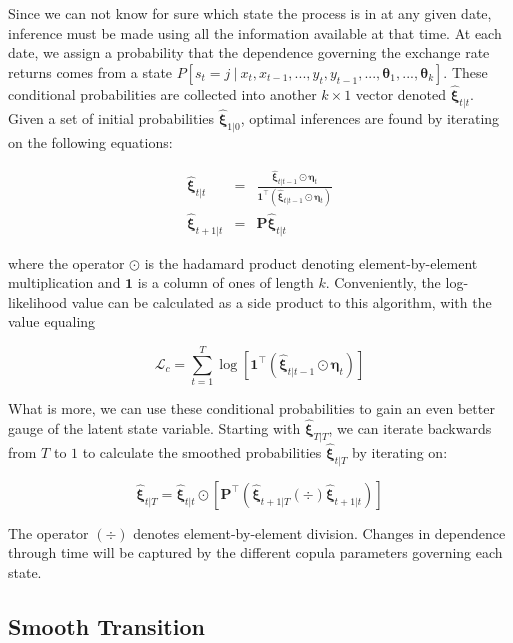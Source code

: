 \documentclass[12pt]{article}
\newcommand{\Lagr}{\mathcal{L}}
\newcommand{\boldXi}{\hat{\boldsymbol{\xi}}}
\begin{document}
Since we can not know for sure which state the process is in at any given date, inference must be made using all the information available at that time. At each date, we assign a probability that the dependence governing the exchange rate returns comes from a state $P\left[s_{t}=j~|~x_{t},x_{t-1},...,y_{t},y_{t-1},...,\mathbf{\theta}_{1},...,\mathbf{\theta}_{k}\right]$. These conditional probabilities are collected into another $k\times 1$ vector denoted $\boldXi_{t|t}$. Given a set of initial probabilities $\boldXi_{1|0}$, optimal inferences are found by iterating on the following equations:

\begin{eqnarray}
	\boldXi_{t|t} &=& \frac{\boldXi_{t|t-1}\odot\boldsymbol{\eta}_{t}}{\mathbf{1}^{\top}\left(\boldXi_{t|t-1}\odot \boldsymbol{\eta}_{t}\right)} \\
	\boldXi_{t+1|t} &=& \mathbf{P} \boldXi_{t|t}
\end{eqnarray}

where the operator $\odot$ is the hadamard product denoting element-by-element multiplication and $\mathbf{1}$ is a column of ones of length $k$. Conveniently, the log-likelihood value can be calculated as a side product to this algorithm, with the value equaling

\begin{equation}
\Lagr_{c} = \sum_{t=1}^{T}\log \left[\mathbf{1}^{\top}\left(\boldXi_{t|t-1} \odot \boldsymbol{\eta}_{t}\right)\right] 
\end{equation}

What is more, we can use these conditional probabilities to gain an even better gauge of the latent state variable. Starting with $\boldXi_{T|T}$, we can iterate backwards from $T$ to $1$ to calculate the smoothed probabilities $\boldXi_{t|T}$ by iterating on:

\begin{equation} \label{eqn:Kim_smooth_probability}
	\boldXi_{t|T} = \boldXi_{t|t} \odot \left[\mathbf{P}^{\top}\left(\boldXi_{t+1|T}\left(\div\right)\boldXi_{t+1|t}\right)\right]
\end{equation}

The operator $\left(\div\right)$ denotes element-by-element division. Changes in dependence through time will be captured by the different copula parameters governing each state.

\subsection{Smooth Transition}
\end{document}
